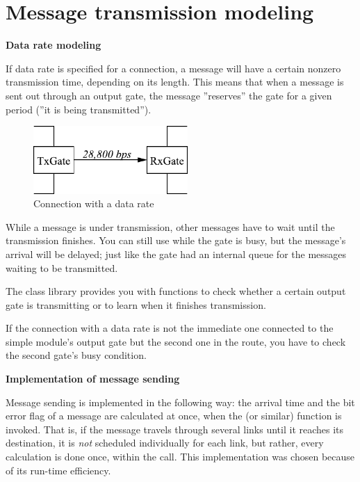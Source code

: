 \section{Message transmission modeling}

\textbf{Data rate modeling}


If data rate is specified for a connection, a message
will have a certain nonzero transmission time, depending on its length.  This means that when a message is
sent out through an output gate, the message ''reserves'' the gate for
a given period (''it is being transmitted'').

\begin{figure}[htbp]
  \begin{center}
    \includegraphics[width=2.315in, height=1.015in]{figures/usmanFig9}
    \caption{Connection with a data rate}
    \label{fig:ch-simple-modules:conn-w-data-rate}
  \end{center}
\end{figure}

While a message is under transmission, other messages have to wait
until the transmission finishes. You can still use 
while the gate is busy, but the message's arrival will be delayed;
just like the gate had an internal queue for the messages waiting to
be transmitted.


The {\opp} class library provides you with functions to check 
whether a certain output gate is transmitting or to learn when 
it finishes transmission.


If the connection with a data rate is not the immediate one connected
to the simple module's output gate but the second
one in the route, you have to check the second gate's busy
condition.


\textbf{Implementation of message sending}


Message sending is implemented in the following way: the arrival
time and the bit error flag of a
message are calculated at once, when the  (or similar)
function is invoked. That is, if the message travels through several
links until it reaches its destination, it is \textit{not} scheduled
individually for each link, but rather, every calculation is done
once, within the  call. This implementation was chosen
because of its run-time efficiency.


